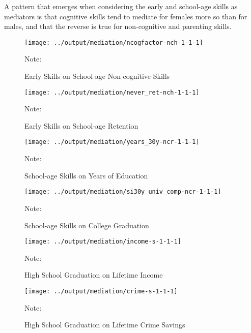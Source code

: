 A pattern that emerges when considering the early and school-age skills as mediators is that cognitive skills tend to mediate for females more so than for males, and that the reverse is true for non-cognitive and parenting skills.

\begin{figure}[H]
\begin{center}
\caption{Early Skills on School-age Non-cognitive Skills}
\label{fig:earlyskills-ncog}
	\texttt{[image: ../output/mediation/ncogfactor-nch-1-1-1]}
\end{center}
\raggedright
Note: 
\end{figure}


\begin{figure}[H]
\begin{center}
\caption{Early Skills on School-age Retention}
\label{fig:earlyskills-retention}
	\texttt{[image: ../output/mediation/never\_ret-nch-1-1-1]}
\end{center}
\raggedright
Note: 
\end{figure}


\begin{figure}[H]
\begin{center}
\caption{School-age Skills on Years of Education}
\label{fig:schoolskills-years}
	\texttt{[image: ../output/mediation/years\_30y-ncr-1-1-1]}
\end{center}
\raggedright
Note: 
\end{figure}


\begin{figure}[H]
\begin{center}
\caption{School-age Skills on College Graduation}
\label{fig:schoolskills-univ}
	\texttt{[image: ../output/mediation/si30y\_univ\_comp-ncr-1-1-1]}
\end{center}
\raggedright
Note: 
\end{figure}

\begin{figure}[H]
\begin{center}
\caption{High School Graduation on Lifetime Income}
\label{fig:hs-npvincome}
	\texttt{[image: ../output/mediation/income-s-1-1-1]}
\end{center}
\raggedright
Note: 
\end{figure}

\begin{figure}[H]
\begin{center}
\caption{High School Graduation on Lifetime Crime Savings}
\label{fig:hs-npvcrime}
	\texttt{[image: ../output/mediation/crime-s-1-1-1]}
\end{center}
\raggedright
Note: 
\end{figure}
